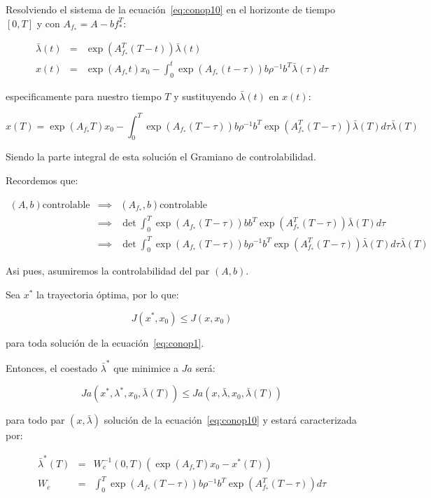         Resolviendo el sistema de la ecuación~\ref{eq:conop10} en el horizonte de tiempo $[0, T]$ y con $A_{f_*} = A - b f_*^T$:

        \begin{eqnarray}
            \bar{\lambda}(t) & = & \exp{(A_{f_*}^T (T - t))} \bar{\lambda}(t) \\
            x(t) & = & \exp{(A_{f_*} t)} x_0 - \int_0^t \exp{(A_{f_*}(t - \tau))} b \rho^{-1} b^T \bar{\lambda}(\tau) d\tau \nonumber
        \end{eqnarray}

        especificamente para nuestro tiempo $T$ y sustituyendo $\bar{\lambda}(t)$ en $x(t)$:

        \begin{equation*}
            x(T) = \exp{(A_{f_*} T)} x_0 - \int_0^T \exp{(A_{f_*}(T - \tau))} b \rho^{-1} b^T \exp{(A_{f_*}^T (T - \tau))} \bar{\lambda}(T) d\tau \bar{\lambda}(T)
        \end{equation*}

        Siendo la parte integral de esta solución el Gramiano de controlabilidad.

        Recordemos que:

        \begin{eqnarray*}
            (A, b) \text{controlable} & \implies & (A_{f_*}, b) \text{controlable} \\
            & \implies & \det{\int_0^T \exp{(A_{f_*}(T - \tau))} b b^T \exp{(A_{f_*}^T (T - \tau))} \bar{\lambda}(T) d\tau} \\
            & \implies & \det{\int_0^T \exp{(A_{f_*}(T - \tau))} b \rho^{-1} b^T \exp{(A_{f_*}^T (T - \tau))} \bar{\lambda}(T) d\tau \bar{\lambda}(T)}
        \end{eqnarray*}

        Asi pues, asumiremos la controlabilidad del par $(A, b)$.

        Sea $x^*$ la trayectoria óptima, por lo que:

        \begin{equation*}
            J(x^*, x_0) \le J(x, x_0)
        \end{equation*}

        para toda solución de la ecuación~\ref{eq:conop1}.

        Entonces, el coestado $\bar{\lambda}^*$ que minimice a $Ja$ será:

        \begin{equation*}
            Ja(x^*, \lambda^*, x_0, \bar{\lambda}(T)) \le Ja(x, \bar{\lambda}, x_0, \bar{\lambda}(T))
        \end{equation*}

        para todo par $(x, \bar{\lambda})$ solución de la ecuación~\ref{eq:conop10} y estará caracterizada por:

        \begin{eqnarray*}
            \bar{\lambda}^*(T) & = & W_c^{-1}(0, T) \left( \exp{(A_{f_*} T)} x_0 - x^*(T) \right) \\
            W_c & = & \int_0^T \exp{\left( A_{f_*}(T-\tau) \right)} b \rho^{-1} b^T \exp{\left( A_{f_*}^T(T-\tau) \right)} d\tau
        \end{eqnarray*}
